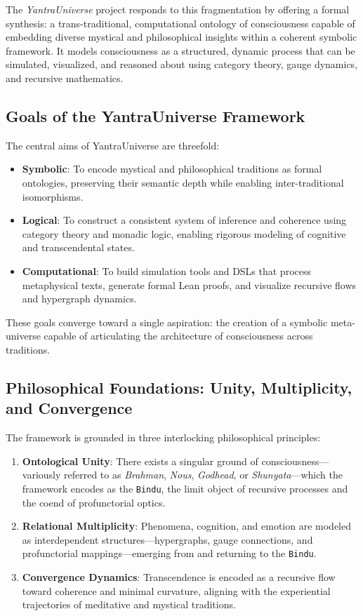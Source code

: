 \documentclass[12pt]{article}
\theoremstyle{plain}
\begin{document}
The \textit{YantraUniverse} project responds to this fragmentation by offering a formal synthesis: a trans-traditional, computational ontology of consciousness capable of embedding diverse mystical and philosophical insights within a coherent symbolic framework. It models consciousness as a structured, dynamic process that can be simulated, visualized, and reasoned about using category theory, gauge dynamics, and recursive mathematics.

\subsection{Goals of the YantraUniverse Framework}

The central aims of YantraUniverse are threefold:

\begin{itemize}
    \item \textbf{Symbolic}: To encode mystical and philosophical traditions as formal ontologies, preserving their semantic depth while enabling inter-traditional isomorphisms.
    \item \textbf{Logical}: To construct a consistent system of inference and coherence using category theory and monadic logic, enabling rigorous modeling of cognitive and transcendental states.
    \item \textbf{Computational}: To build simulation tools and DSLs that process metaphysical texts, generate formal Lean proofs, and visualize recursive flows and hypergraph dynamics.
\end{itemize}

These goals converge toward a single aspiration: the creation of a symbolic meta-universe capable of articulating the architecture of consciousness across traditions.

\subsection{Philosophical Foundations: Unity, Multiplicity, and Convergence}

The framework is grounded in three interlocking philosophical principles:

\begin{enumerate}
    \item \textbf{Ontological Unity}: There exists a singular ground of consciousness—variously referred to as \textit{Brahman}, \textit{Nous}, \textit{Godhead}, or \textit{Shunyata}—which the framework encodes as the \texttt{Bindu}, the limit object of recursive processes and the coend of profunctorial optics.
    \item \textbf{Relational Multiplicity}: Phenomena, cognition, and emotion are modeled as interdependent structures—hypergraphs, gauge connections, and profunctorial mappings—emerging from and returning to the \texttt{Bindu}.
    \item \textbf{Convergence Dynamics}: Transcendence is encoded as a recursive flow toward coherence and minimal curvature, aligning with the experiential trajectories of meditative and mystical traditions.
\end{enumerate}
\end{document}
